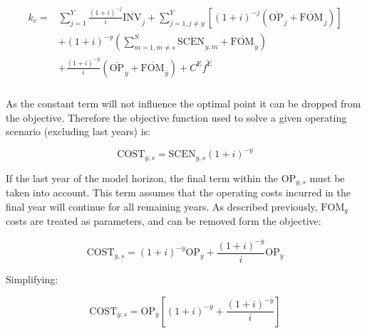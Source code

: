 \documentclass{article}
\newcommand{\sYears}{Y}
\newcommand{\sScenarios}{S}
\newcommand{\iGenerator}{g}
\newcommand{\iYear}{y}
\newcommand{\iYearTerminal}{\overline{\iYear}}
\newcommand{\iYearAlias}{j}
\newcommand{\iScenario}{s}
\newcommand{\iScenarioAlias}{m}
\newcommand{\cOperatingCost}[1][\iYear,\iScenario]{\mathrm{OP}_{#1}}
\newcommand{\cFixedOperationsMaintenanceCost}[1][\iGenerator]{\mathrm{FOM}_{#1}}
\newcommand{\cInvestmentCost}[1][\iYear]{\mathrm{INV}_{#1}}
\newcommand{\cInterestRate}{i}
\newcommand{\cEmissionsTargetViolationPenalty}{C^{\mathrm{E}}}
\newcommand{\cObjectiveFunction}{\mathrm{COST}}
\newcommand{\cOperatingCostScenario}[1][\iYear,\iScenario]{\mathrm{SCEN}_{#1}}
\newcommand{\vEmissionsTargetViolation}{f^{\mathrm{E}}}
\begin{document}
\begin{align}
\begin{split}
	k_{c} = & \sum\limits_{\iYearAlias=1}^{\sYears} \frac{(1+\cInterestRate)^{-\iYearAlias}}{\cInterestRate}\overline{\cInvestmentCost[]}_{\iYearAlias} + \sum\limits_{\iYearAlias=1, \iYearAlias \neq \iYear}^{\sYears} \left[(1+\cInterestRate)^{-\iYearAlias} (\overline{\cOperatingCost[]}_{\iYearAlias} + \overline{\cFixedOperationsMaintenanceCost[]}_{\iYearAlias}) \right]\\
	& + (1 + \cInterestRate)^{-\iYear}\left(\sum\limits_{\iScenarioAlias = 1,\iScenarioAlias\neq \iScenario}^{\sScenarios}\overline{\cOperatingCostScenario[]}_{\iYear,\iScenarioAlias} + \overline{\cFixedOperationsMaintenanceCost[]}_{\iYear}\right)\\
	& + \frac{(1+\cInterestRate)^{-\iYearTerminal}}{\cInterestRate} \left(\overline{\cOperatingCost[]}_{\iYearTerminal} + \overline{\cFixedOperationsMaintenanceCost[]}_{\iYearTerminal} \right) + \cEmissionsTargetViolationPenalty \overline{\vEmissionsTargetViolation}\\
\end{split}
\end{align}

As the constant term will not influence the optimal point it can be dropped from the objective. Therefore the objective function used to solve a given operating scenario (excluding last years) is:

\begin{equation}
	\cObjectiveFunction_{\iYear,\iScenario} = \cOperatingCostScenario(1+\cInterestRate)^{-\iYear}
\end{equation}

If the last year of the model horizon, the final term within the $\cOperatingCost$ must be taken into account. This term assumes that the operating costs incurred in the final year will continue for all remaining years. As described previously, $\cFixedOperationsMaintenanceCost$ costs are treated as parameters, and can be removed form the objective:

\begin{equation}
	\cObjectiveFunction_{\iYearTerminal,\iScenario} = (1+\cInterestRate)^{-\iYearTerminal} \cOperatingCost[\iYearTerminal] + \frac{(1+\cInterestRate)^{-\iYearTerminal}}{\cInterestRate} \cOperatingCost[\iYearTerminal]
\end{equation}

Simplifying:

\begin{equation}
	\cObjectiveFunction_{\iYearTerminal,\iScenario} = \cOperatingCost[\iYearTerminal]\left[(1+\cInterestRate)^{-\iYearTerminal}  + \frac{(1+\cInterestRate)^{-\iYearTerminal}}{\cInterestRate}\right]
\end{equation}
\end{document}
